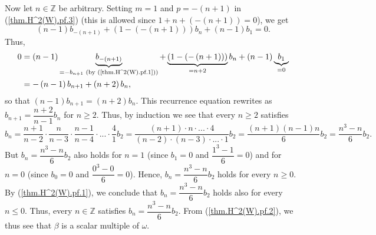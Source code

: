 \documentclass
[numbers=enddot,12pt,final,onecolumn,german,notitlepage]{scrartcl}%
\theoremstyle{definition}
\begin{document}
Now let $n\in\mathbb{Z}$ be arbitrary. Setting $m=1$ and $p=-\left(
n+1\right)  $ in (\ref{thm.H^2(W).pf.3}) (this is allowed since $1+n+\left(
-\left(  n+1\right)  \right)  =0$), we get%
\[
\left(  n-1\right)  b_{-\left(  n+1\right)  }+\left(  1-\left(  -\left(
n+1\right)  \right)  \right)  b_{n}+\left(  n-1\right)  b_{1}=0.
\]
Thus,%
\begin{align*}
0  &  =\left(  n-1\right)  \underbrace{b_{-\left(  n+1\right)  }}%
_{=-b_{n+1}\text{ (by (\ref{thm.H^2(W).pf.1}))}}+\underbrace{\left(  1-\left(
-\left(  n+1\right)  \right)  \right)  }_{=n+2}b_{n}+\left(  n-1\right)
\underbrace{b_{1}}_{=0}\\
&  =-\left(  n-1\right)  b_{n+1}+\left(  n+2\right)  b_{n},
\end{align*}
so that $\left(  n-1\right)  b_{n+1}=\left(  n+2\right)  b_{n}$. This
recurrence equation rewrites as $b_{n+1}=\dfrac{n+2}{n-1}b_{n}$ for $n\geq2$.
Thus, by induction we see that every $n\geq2$ satisfies%
\[
b_{n}=\dfrac{n+1}{n-2}\cdot\dfrac{n}{n-3}\cdot\dfrac{n-1}{n-4}\cdot
...\cdot\dfrac{4}{1}b_{2}=\dfrac{\left(  n+1\right)  \cdot n\cdot...\cdot
4}{\left(  n-2\right)  \cdot\left(  n-3\right)  \cdot...\cdot1}b_{2}%
=\dfrac{\left(  n+1\right)  \left(  n-1\right)  n}{6}b_{2}=\dfrac{n^{3}-n}%
{6}b_{2}.
\]
But $b_{n}=\dfrac{n^{3}-n}{6}b_{2}$ also holds for $n=1$ (since $b_{1}=0$ and
$\dfrac{1^{3}-1}{6}=0$) and for $n=0$ (since $b_{0}=0$ and $\dfrac{0^{3}-0}%
{6}=0$). Hence, $b_{n}=\dfrac{n^{3}-n}{6}b_{2}$ holds for every $n\geq0$. By
(\ref{thm.H^2(W).pf.1}), we conclude that $b_{n}=\dfrac{n^{3}-n}{6}b_{2}$
holds also for every $n\leq0$. Thus, every $n\in\mathbb{Z}$ satisfies
$b_{n}=\dfrac{n^{3}-n}{6}b_{2}$. From (\ref{thm.H^2(W).pf.2}), we thus see
that $\beta$ is a scalar multiple of $\omega$.
\end{document}
